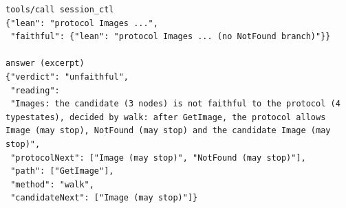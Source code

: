 \begin{lstlisting}[language={},basicstyle=\ttfamily\footnotesize,breaklines=true]
tools/call session_ctl
{"lean": "protocol Images ...",
 "faithful": {"lean": "protocol Images ... (no NotFound branch)"}}

answer (excerpt)
{"verdict": "unfaithful",
 "reading":
 "Images: the candidate (3 nodes) is not faithful to the protocol (4 typestates), decided by walk: after GetImage, the protocol allows Image (may stop), NotFound (may stop) and the candidate Image (may stop)",
 "protocolNext": ["Image (may stop)", "NotFound (may stop)"],
 "path": ["GetImage"],
 "method": "walk",
 "candidateNext": ["Image (may stop)"]}
\end{lstlisting}

